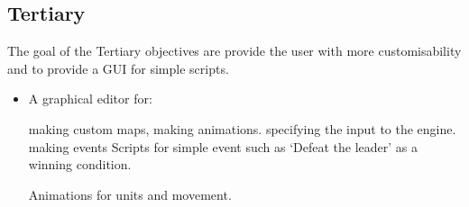 \subsection{Tertiary} 
\label{tertiary}
The goal of the Tertiary objectives are provide the user with more customisability and to provide a GUI for simple scripts. 

\begin{itemize}
	\cross Custom events
	\begin{itemize}
		\item Attached to units or titles, could be used for:
		\begin{itemize}
			\item Making the player win if some enemies unit has less then 50\% Hit Points.
			
			\item Damaging a character if step on a specified.
			
			\item Showing some part of the story when a player's character reach a specified tile.
		\end{itemize}
	\end{itemize}
	
	\item A graphical editor for:
	\begin{itemize}
		\tick  making custom maps,
		\tick  making animations.
		\cross  specifying the input to the engine.
		\cross  making events
		\cross  Scripts for simple event such as `Defeat the leader' as a winning condition.
	\end{itemize}
	
	\tick Animations for units and movement.
\end{itemize}